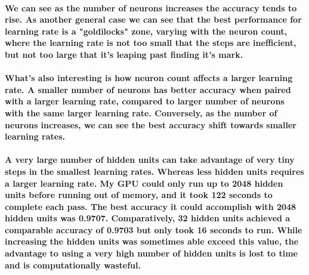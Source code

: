 \documentclass[10pt,a4paper]{report}
\begin{document}
\paragraph{
We can see as the number of neurons increases the accuracy tends to rise. As another general case we can see that the best performance for learning rate is a "goldilocks" zone, varying with the neuron count, where the learning rate is not too small that the steps are inefficient, but not too large that it's leaping past finding it's mark. 
}

\paragraph{
What's also interesting is how neuron count affects a larger learning rate. A smaller number of neurons has better accuracy when paired with a larger learning rate, compared to larger number of neurons with the same larger learning rate. Conversely, as the number of neurons increases, we can see the best accuracy shift towards smaller learning rates.
}

\paragraph{
 A very large number of hidden units can take advantage of very tiny steps in the smallest learning rates. Whereas less hidden units requires a larger learning rate. My GPU could only run up to 2048 hidden units before running out of memory, and it took 122 seconds to complete each pass. The best accuracy it could accomplish with 2048 hidden units was 0.9707. Comparatively, 32 hidden units achieved a comparable accuracy of 0.9703 but only took 16 seconds to run. While increasing the hidden units was sometimes able exceed this value, the advantage to using a very high number of hidden units is lost to time and is computationally wasteful.
}
\end{document}
